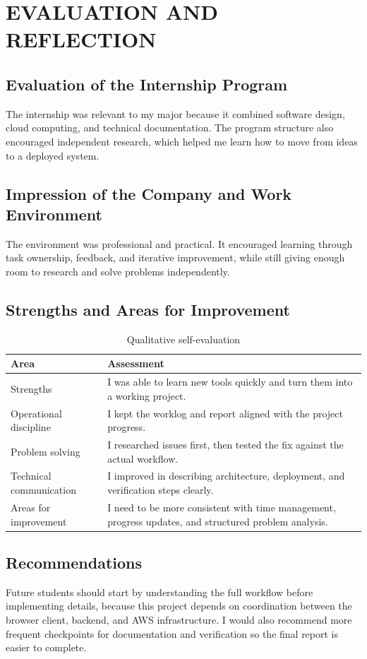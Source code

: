 \chapter{EVALUATION AND REFLECTION}

\section{Evaluation of the Internship Program}

The internship was relevant to my major because it combined software design,
cloud computing, and technical documentation. The program structure also
encouraged independent research, which helped me learn how to move from ideas
to a deployed system.

\section{Impression of the Company and Work Environment}

The environment was professional and practical. It encouraged learning through
task ownership, feedback, and iterative improvement, while still giving enough
room to research and solve problems independently.

\section{Strengths and Areas for Improvement}

\begin{table}[H]
  \centering
  \caption{Qualitative self-evaluation}
  \begin{tabularx}{\textwidth}{@{}P{4.0cm}Y@{}}
    \toprule
    \textbf{Area} & \textbf{Assessment} \\
    \midrule
    Strengths & I was able to learn new tools quickly and turn them into a
    working project. \\
    Operational discipline & I kept the worklog and report aligned with the
    project progress. \\
    Problem solving & I researched issues first, then tested the fix against
    the actual workflow. \\
    Technical communication & I improved in describing architecture,
    deployment, and verification steps clearly. \\
    Areas for improvement & I need to be more consistent with time management,
    progress updates, and structured problem analysis. \\
    \bottomrule
  \end{tabularx}
\end{table}

\section{Recommendations}

Future students should start by understanding the full workflow before
implementing details, because this project depends on coordination between the
browser client, backend, and AWS infrastructure. I would also recommend more
frequent checkpoints for documentation and verification so the final report is
easier to complete.